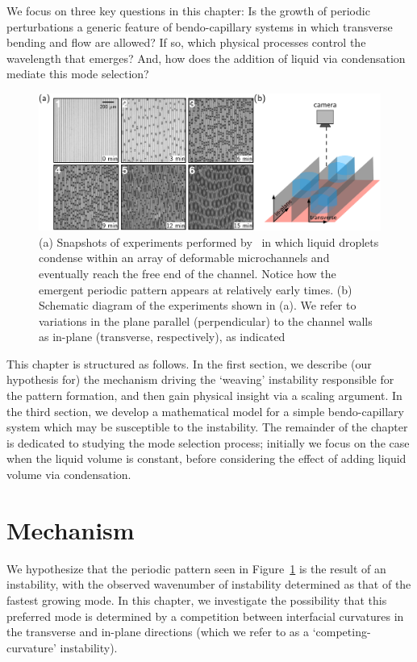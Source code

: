 We focus on three key questions in this chapter: Is the growth of periodic perturbations a generic feature of bendo-capillary systems in which transverse bending and flow are allowed? If so, which physical processes control the wavelength that emerges? And, how does the addition of liquid via condensation mediate this mode selection?


\begin{figure}[h]
\centering
\includegraphics[width = \textwidth]{BrinkmannExperiments}
\caption{(a) Snapshots of experiments performed by~\cite{Seemann2011JPhysCondMat} in which liquid droplets condense within an array of deformable microchannels and eventually reach the free end of the channel. Notice how the emergent periodic pattern appears at relatively early times. (b) Schematic diagram of the experiments shown in (a). We refer to variations in the plane parallel (perpendicular) to the channel walls as in-plane (transverse, respectively), as indicated}
\label{fig:InstabilityChapter:Intro:ExptSnapshots}
\end{figure}

This chapter is structured as follows. In the first section, we describe (our hypothesis for) the mechanism driving the `weaving' instability responsible for the pattern formation, and then gain physical insight via a scaling argument. In the third section, we develop a mathematical model for a simple bendo-capillary system which may be susceptible to the instability. The remainder of the chapter is dedicated to  studying the mode selection process; initially we focus on the case when the liquid volume is constant, before considering the effect of adding liquid volume via condensation.


\section{Mechanism}
We hypothesize that the periodic pattern seen in Figure~\ref{fig:InstabilityChapter:Intro:ExptSnapshots} is the result of an instability, with the observed wavenumber of instability determined as that of the fastest growing mode. In this chapter, we investigate the possibility that this preferred mode is determined by a competition between interfacial curvatures in the transverse and in-plane directions (which we refer to as a `competing-curvature' instability).

